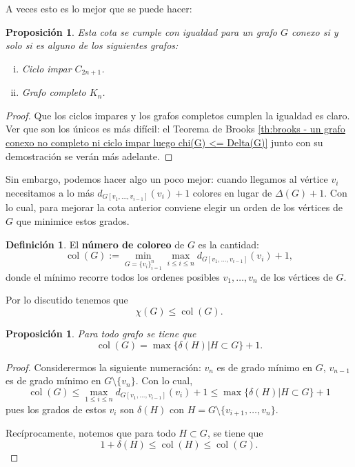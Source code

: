 \documentclass[12pt]{report}
\theoremstyle{plain}
\newtheorem{proposition}[theorem]{Proposición}
\theoremstyle{definition}
\newtheorem{definition}[theorem]{Definición}
\newcommand{\col}[1]{\operatorname{col} (#1)}
\begin{document}

A veces esto es lo mejor que se puede hacer:
\begin{proposition}
Esta cota se cumple con igualdad para un grafo $G$ conexo si y solo si es alguno de los siguientes grafos:
\begin{enumerate}[(i)]
\item Ciclo impar $C_{2n+1}$.
\item Grafo completo $K_n$.
\end{enumerate}
\end{proposition}
\begin{proof}
Que los ciclos impares y los grafos completos cumplen la igualdad es claro. Ver que son los únicos es más difícil: el Teorema de Brooks \ref{th:brooks - un grafo conexo no completo ni ciclo impar luego chi(G) <= Delta(G)} junto con su demostración se verán más adelante.
\end{proof}

Sin embargo, podemos hacer algo un poco mejor: cuando llegamos al vértice $v_i$ necesitamos a lo más $d_{G[v_1,\ldots,v_{i-1}]}(v_i) + 1$ colores en lugar de $\Delta (G) + 1$. Con lo cual, para mejorar la cota anterior conviene elegir un orden de los vértices de $G$ que minimice estos grados.


\begin{definition}
El \textbf{número de coloreo} de $G$ es la cantidad:
\[
    \col G := \min_{G = \{v_i\}_{i = 1}^n} \max_{i \leq i \leq n} d_{G [v_1, \ldots, v_{i-1}]} (v_i) + 1 ,
\]
donde el mínimo recorre todos los ordenes posibles $v_1, \ldots, v_n$ de los vértices de $G.$
\end{definition}
Por lo discutido tenemos que
\[
    \boxed{\chi (G) \leq \col G .}
\]

\begin{proposition}
Para todo grafo se tiene que
\[
    \col G = \max \{ \delta (H) | H \subset G \} + 1.
\]
\end{proposition}
\begin{proof}
Considerermos la siguiente numeración: $v_n$ es de grado mínimo en $G$, $v_{n-1}$ es de grado mínimo en $G \setminus \{v_n\}$. Con lo cual,
\[
    \col G \leq \max_{1 \leq i \leq n} d_{G [ v_1, \ldots, v_{i-1}]} (v_i) + 1 \leq \max \{ \delta (H) | H \subset G \} + 1
\]
pues los grados de estos $v_i$ son $\delta (H)$ con $H = G \setminus \{v_{i+1}, \ldots, v_n\}$.

Recíprocamente, notemos que para todo $H \subset G$, se tiene que
\[
    1 + \delta (H) \leq \col H \leq \col  G .
\]
\end{proof}
\end{document}
